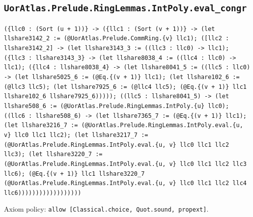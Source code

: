 \documentclass[11pt]{article}
\begin{document}
\subsection*{\texttt{UorAtlas.Prelude.RingLemmas.IntPoly.eval\_congr}}
\noindent\texttt{(\{llc0 : (Sort (u + 1))\} -> (\{llc1 : (Sort (v + 1))\} -> (let llshare3142\_2 := (@UorAtlas.Prelude.CommRing.\{v\} llc1); ([llc2 : llshare3142\_2] -> (let llshare3143\_3 := ((llc3 : llc0) -> llc1); (\{llc3 : llshare3143\_3\} -> (let llshare8038\_4 := ((llc4 : llc0) -> llc1); (\{llc4 : llshare8038\_4\} -> (let llshare8041\_5 := ((llc5 : llc0) -> (let llshare5025\_6 := (@Eq.\{(v + 1)\} llc1); (let llshare102\_6 := (@llc3 llc5); (let llshare7925\_6 := (@llc4 llc5); (@Eq.\{(v + 1)\} llc1 llshare102\_6 llshare7925\_6))))); ((llc5 : llshare8041\_5) -> (let llshare508\_6 := (@UorAtlas.Prelude.RingLemmas.IntPoly.\{u\} llc0); ((llc6 : llshare508\_6) -> (let llshare7365\_7 := (@Eq.\{(v + 1)\} llc1); (let llshare3216\_7 := (@UorAtlas.Prelude.RingLemmas.IntPoly.eval.\{u, v\} llc0 llc1 llc2); (let llshare3217\_7 := (@UorAtlas.Prelude.RingLemmas.IntPoly.eval.\{u, v\} llc0 llc1 llc2 llc3); (let llshare3220\_7 := (@UorAtlas.Prelude.RingLemmas.IntPoly.eval.\{u, v\} llc0 llc1 llc2 llc3 llc6); (@Eq.\{(v + 1)\} llc1 llshare3220\_7 (@UorAtlas.Prelude.RingLemmas.IntPoly.eval.\{u, v\} llc0 llc1 llc2 llc4 llc6))))))))))))))))))}\par
\noindent Axiom policy: \texttt{allow [Classical.choice, Quot.sound, propext]}.\par
\end{document}

